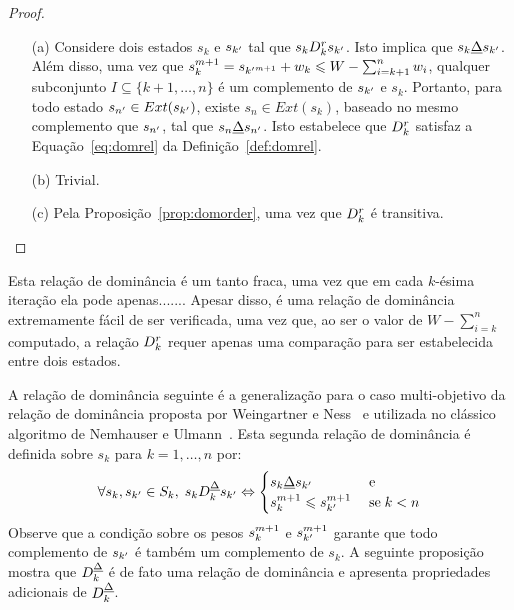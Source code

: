 \begin{proof}
  \noindent
  \begin{enumerate}
    \item[(a)]{
      Considere dois estados $s_k$ e $s_{{k'}}$ tal que $s_k D_k^r s_{{k'}}$.
      Isto implica que $s_k \underline{\Delta} s_{{k'}}$.
      Além disso, uma vez que
      $s_k^{m+1} = s_{{k'}^{m+1}} + w_k \leqslant W - \sum_{i=k+1}^n w_i$,
      qualquer subconjunto $I \subseteq \{k+1, \ldots, n\}$ é um complemento
      de $s_{{k'}}$ e $s_k$.
      Portanto, para todo estado $s_{{n'}} \in Ext(s_{{k'}})$,
      existe $s_n \in Ext(s_k)$, baseado no mesmo complemento que $s_{{n'}}$,
      tal que $s_n \underline{\Delta} s_{{n'}}$.
      Isto estabelece que $D_k^r$ satisfaz a Equação~\ref{eq:domrel} da
      Definição~\ref{def:domrel}. }
    \item[(b)]{Trivial.}
    \item[(c)]{Pela Proposição~\ref{prop:domorder}, uma vez que $D_k^r$ é transitiva.}
    \qedhere
  \end{enumerate}
\end{proof}

Esta relação de dominância é um tanto fraca, uma vez que em cada $k$-ésima
iteração ela pode apenas.......
Apesar disso, é uma relação de dominância extremamente fácil de ser verificada,
uma vez que, ao ser o valor de $W - \sum_{i=k}^n$ computado, a relação $D_k^r$
requer apenas uma comparação para ser estabelecida entre dois estados.

A relação de dominância seguinte é a generalização para o caso multi-objetivo
da relação de dominância proposta por Weingartner e Ness~\cite{weingartner1967methods}
e utilizada no clássico algoritmo de Nemhauser e Ulmann~\cite{nemhauser1969discrete}.
Esta segunda relação de dominância é definida sobre $s_k$ para $k = 1, \ldots, n$ por:
\begin{displaymath}
  \forall s_k, s_{{k'}} \in S_k, \; s_k D_k^{\underline{\Delta}} s_{{k'}}
    \Leftrightarrow
    \begin{cases}
      s_k \underline{\Delta} s_{{k'}} \; & \text{e} \\
      s_k^{m+1} \leqslant s_{{k'}}^{m+1} \; & \text{se} \; k < n
    \end{cases}
\end{displaymath}
Observe que a condição sobre os pesos $s_k^{m+1}$ e $s_{{k'}}^{m+1}$
garante que todo complemento de $s_{{k'}}$ é também um complemento de
$s_k$.
A seguinte proposição mostra que $D_k^{\underline{\Delta}}$ é de fato uma relação de
dominância e apresenta propriedades adicionais de $D_k^{\underline{\Delta}}$.

